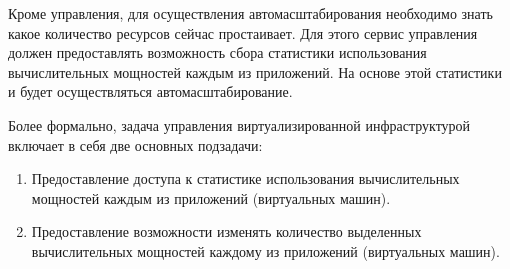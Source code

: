 Кроме управления, для осуществления автомасштабирования необходимо знать какое количество ресурсов сейчас простаивает\cite{fake-32}.
Для этого сервис управления должен предоставлять возможность сбора статистики использования вычислительных мощностей каждым из приложений\cite{fake-33}.
На основе этой статистики и будет осуществляться автомасштабирование.

Более формально, задача управления виртуализированной инфраструктурой включает в себя две основных подзадачи:
\begin{enumerate}
    \item Предоставление доступа к статистике использования вычислительных мощностей каждым из приложений (виртуальных машин).
    \item Предоставление возможности изменять количество выделенных вычислительных мощностей каждому из приложений (виртуальных машин).
\end{enumerate}
